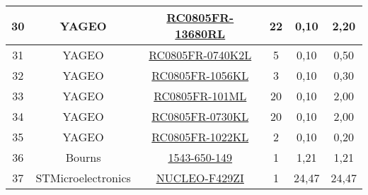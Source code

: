\begin{table}[H]
\begin{tabular}{|c|c|c|c|c|c|}
30                   & YAGEO               & \href{https://ar.mouser.com/datasheet/2/447/PYu_RC_Group_51_RoHS_L_11-1984063.pdf}{RC0805FR-13680RL}                                                                                                             & 22       & 0,10            & 2,20            \\ \hline
31                   & YAGEO               & \href{https://ar.mouser.com/datasheet/2/447/YAGEO_PYu_RC_Group_51_RoHS_L_12-3313492.pdf}{RC0805FR-0740K2L}                                                                                                      & 5        & 0,10            & 0,50            \\ \hline
32                   & YAGEO               & \href{https://ar.mouser.com/datasheet/2/447/PYu_RC_Group_51_RoHS_L_11-1984063.pdf}{RC0805FR-1056KL}                                                                                                              & 3        & 0,10            & 0,30            \\ \hline
33                   & YAGEO               & \href{https://ar.mouser.com/datasheet/2/447/PYu_RC_Group_51_RoHS_L_11-1984063.pdf}{RC0805FR-101ML}                                                                                                               & 20       & 0,10            & 2,00            \\ \hline
34                   & YAGEO               & \href{https://ar.mouser.com/datasheet/2/447/YAGEO_PYu_RC_Group_51_RoHS_L_12-3313492.pdf}{RC0805FR-0730KL}                                                                                                       & 20       & 0,10            & 2,00            \\ \hline
35                   & YAGEO               & \href{https://ar.mouser.com/datasheet/2/447/PYu_RC_Group_51_RoHS_L_11-1984063.pdf}{RC0805FR-1022KL}                                                                                                              & 2        & 0,10            & 0,20            \\ \hline
36                   & Bourns              & \href{https://www.arrow.com/en/products/1543-650-149/bourns}{1543-650-149}                                                                                                                                             & 1        & 1,21            & 1,21            \\ \hline
37                   & STMicroelectronics  & \href{https://ar.mouser.com/datasheet/2/389/nucleo_l496zg-1848160.pdf}{NUCLEO-F429ZI}                                                                                                                                 & 1        & 24,47           & 24,47           \\ \hline

\end{tabular}
\end{table}
